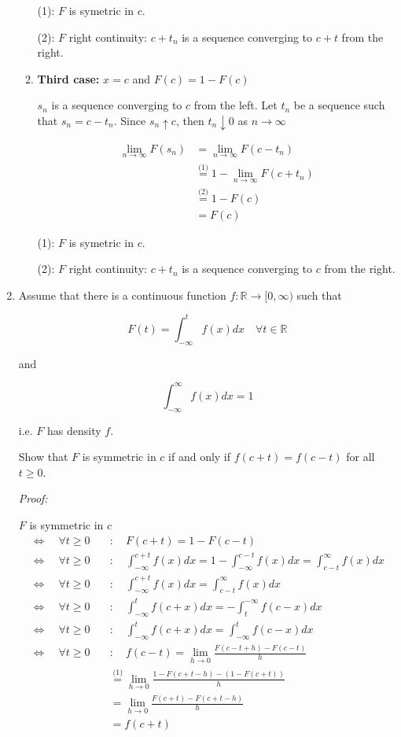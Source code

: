 \documentclass[12pt]{article}
\begin{document}
\begin{enumerate}
\begin{enumerate}
(1): $F$ is symetric in $c$.

(2): $F$ right continuity: $c+t_n$ is a sequence converging to $c+t$ from the right. 

\item \textbf{Third case:} $x=c$     and      $F(c)=1-F(c)$

  $s_n$ is a sequence converging to $c$ from the left. Let $t_n$ be a sequence such that $s_n =c - t_n$. Since $s_n \uparrow c$, then  \( t_n \downarrow 0 \) as \( n \to \infty \)
  
    \begin{align*}
        \lim_{n \to \infty} F(s_n) &= \lim_{n \to \infty} F(c-t_n)\\
        &\stackrel{\text{(1)}}{=} 1-\lim_{n \to \infty} F(c+t_n)\\
        &\stackrel{\text{(2)}}{=} 1-F(c)\\
        &= F(c)
    \end{align*}

(1): $F$ is symetric in $c$.
    
    (2): $F$ right continuity: $c+t_n$ is a sequence converging to $c$ from the right.


\end{enumerate}



\item Assume that there is a continuous function $f: \mathbb{R} \rightarrow[0, \infty)$ such that

$$
F(t)=\int_{-\infty}^{t} f(x) d x \quad \forall t \in \mathbb{R}
$$

and

$$
\int_{-\infty}^{\infty} f(x) d x=1
$$

i.e. $F$ has density $f$.


Show that $F$ is symmetric in $c$ if and only if $f(c+t)=f(c-t)$ for all $t \geq 0$.


\textit{Proof:}

$F$ is symmetric in $c$ 
\begin{align*}
\Leftrightarrow \quad \forall t \geq 0 \quad &: \quad F(c+t)=1-F(c-t) \\
\Leftrightarrow \quad \forall t \geq 0 \quad &: \quad \int_{-\infty}^{c+t} f(x) d x=1-\int_{-\infty}^{c-t} f(x) d x = \int_{c-t}^{\infty} f(x) d x\\
\Leftrightarrow \quad \forall t \geq 0 \quad &: \quad \int_{-\infty}^{c+t} f(x) d x=\int_{c-t}^{\infty} f(x) d x\\
\Leftrightarrow \quad \forall t \geq 0 \quad &: \quad \int_{-\infty}^{t} f(c+x) d x=-\int_{t}^{-\infty} f(c-x) d x\\
\Leftrightarrow \quad \forall t \geq 0 \quad &: \quad \int_{-\infty}^{t} f(c+x) d x=\int_{-\infty}^{t} f(c-x) d x\\
\Leftrightarrow \quad \forall t \geq 0 \quad &: \quad f(c-t)= \lim_{h \to 0} \frac{F(c-t+h)-F(c-t)}{h}  \\
&\stackrel{\text{(1)}}{=} \lim_{h \to 0} \frac{1-F(c+t-h)-(1-F(c+t))}{h}\\
&= \lim_{h \to 0} \frac{F(c+t)-F(c+t-h)}{h} \\
&= f(c+t)
\end{align*}


\end{enumerate}
\end{document}
